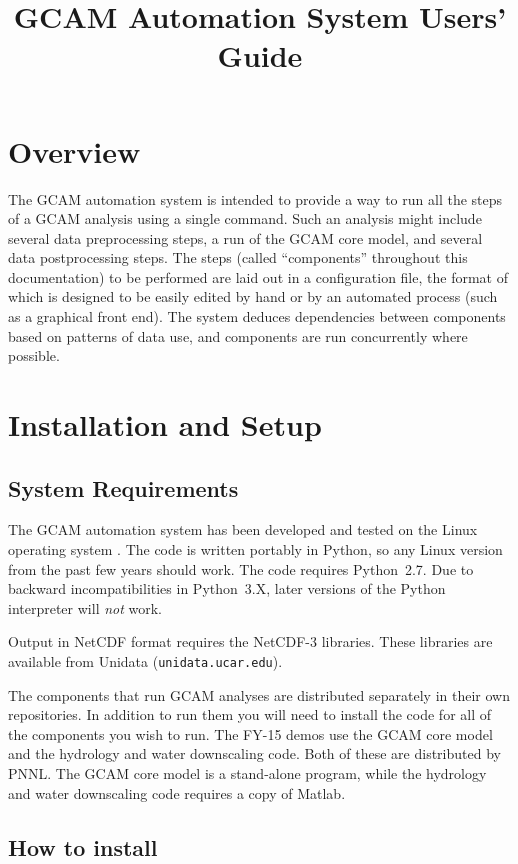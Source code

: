 \documentclass[11pt]{article}
\title{{GCAM} Automation System Users' Guide}
\begin{document}
\maketitle

\section{Overview}
The GCAM automation system is intended to provide a way to run all the
steps of a GCAM analysis using a single command.  Such an analysis
might include several data preprocessing steps, a run of the GCAM core
model, and several data postprocessing steps.  The steps (called
``components'' throughout this documentation) to be performed are laid
out in a configuration file, the format of which is designed to be
easily edited by hand or by an automated process (such as a graphical
front end).  The system deduces dependencies between components based on
patterns of data use, and components are run concurrently where possible.


\section{Installation and Setup}
\subsection{System Requirements}

The GCAM automation system has been developed and tested on the Linux
operating system .  The code is written portably in Python, so any
Linux version
from the past few years should work.  The code
requires Python~2.7.  Due to backward incompatibilities in Python~3.X,
later versions of the Python interpreter will \emph{not} work.

Output in NetCDF format requires the NetCDF-3 libraries.  These
libraries are available from Unidata (\texttt{unidata.ucar.edu}).

The components that run GCAM analyses are distributed separately in their
own repositories.  In addition to run them you will need to install
the code for all of the components you wish to run.  The FY-15 demos use
the GCAM core model and the hydrology and water downscaling code.
Both of these are distributed by PNNL.  The GCAM core model is a
stand-alone program, while the hydrology and water downscaling code
requires a copy of Matlab.

\subsection{How to install}
\end{document}
